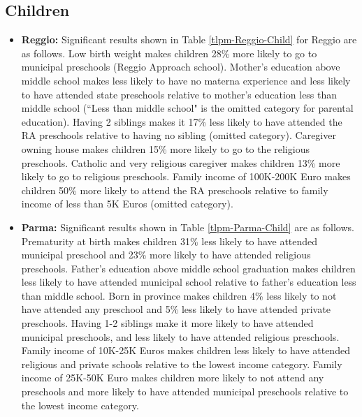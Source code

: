 \documentclass[12pt]{article}
\begin{document}
\subsection{Children}
\begin{itemize}
\item \textbf{Reggio:} Significant results shown in Table \ref{tlpm-Reggio-Child} for Reggio are as follows. Low birth weight makes children 28\% more likely to go to municipal preschools (Reggio Approach school). Mother's education above middle school makes less likely to have no materna experience and less likely to have attended state preschools relative to mother's education less than middle school (``Less than middle school" is the omitted category for parental education). Having 2 siblings makes it 17\% less likely to have attended the RA preschools relative to having no sibling (omitted category). Caregiver owning house makes children 15\% more likely to go to the religious preschools. Catholic and very religious caregiver makes children 13\% more likely to go to religious preschools. Family income of 100K-200K Euro makes children 50\% more likely to attend the RA preschools relative to family income of less than 5K Euros (omitted category). 

\item \textbf{Parma:} Significant results shown in Table \ref{tlpm-Parma-Child} are as follows. Prematurity at birth makes children 31\% less likely to have attended municipal preschool and 23\% more likely to have attended religious preschools. Father's education above middle school graduation makes children less likely to have attended municipal school relative to father's education less than middle school. Born in province makes children 4\% less likely to not have attended any preschool and 5\% less likely to have attended private preschools. Having 1-2 siblings make it more likely to have attended municipal preschools, and less likely to have attended religious preschools. Family income of 10K-25K Euros makes children less likely to have attended religious and private schools relative to the lowest income category. Family income of 25K-50K Euro makes children more likely to not attend any preschools and more likely to have attended municipal preschools relative to the lowest income category.



\end{itemize}
\end{document}
